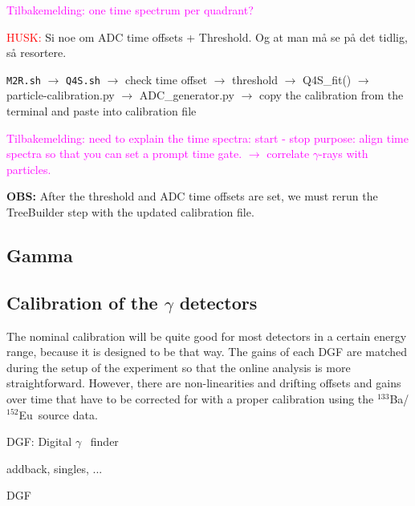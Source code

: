\documentclass[twoside,english]{uiofysmaster/uiofysmaster}
\newcommand{\ga}{$\gamma$}
\newcommand{\Ba}{$^{133}$Ba}
\newcommand{\Eu}{$^{152}$Eu}
\begin{document}
\textcolor{Magenta}{Tilbakemelding: \newline 
one time spectrum per quadrant?
}


\textcolor{red}{HUSK:} Si noe om ADC time offsets + Threshold. Og at man må se på det tidlig, så resortere.


\texttt{M2R.sh} $\rightarrow$ \texttt{Q4S.sh} $\rightarrow$ check time offset $\rightarrow$ threshold $\rightarrow$ Q4S\_fit() $\rightarrow$ particle-calibration.py $\rightarrow$  ADC\_generator.py $\rightarrow$ copy the calibration from the terminal and paste into calibration file 

\textcolor{Magenta}{Tilbakemelding: \newline 
need to explain the time spectra: start - stop \newline
purpose: align time spectra so that you can set a prompt time gate. \newline
$\rightarrow$ correlate $\gamma$-rays with particles.
}


\textbf{OBS:}\newline
After the threshold and ADC time offsets are set, we must rerun the TreeBuilder step with the updated calibration file.


\subsection{Gamma}

\subsection*{Calibration of the \texorpdfstring{$\gamma$}{Gamma} detectors}

The nominal calibration will be quite good for most detectors in a certain energy range, because it is designed to be that way. The gains of each DGF are matched during the setup of the experiment so that the online analysis is more straightforward. However, there are non-linearities and drifting offsets and gains over time that have to be corrected for with a proper calibration using the \Ba/\Eu\ source data.


DGF: Digital \ga~ finder

addback, singles, ...


\begin{table}[ht] 
	\centering 
	\caption{DGF}
	
	\label{tab:DGF}
\end{table}
\end{document}
